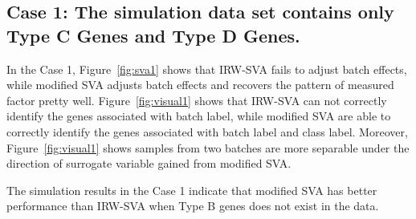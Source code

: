 \documentclass[11pt]{article}
\begin{document}
\subsection{Case 1: The simulation data set contains only Type C Genes and Type D Genes.}

In the Case 1, Figure~\ref{fig:sva1} shows that IRW-SVA fails to adjust batch effects, while modified SVA adjusts batch effects and recovers the pattern of measured factor pretty well. Figure~\ref{fig:visual1} shows that IRW-SVA can not correctly identify the genes associated with batch label, while modified SVA are able to correctly identify the genes associated with batch label and class label. Moreover, Figure~\ref{fig:visual1} shows samples from two batches are more separable under the direction of surrogate variable gained from modified SVA. 

The simulation results in the Case 1 indicate that modified SVA has better performance than IRW-SVA when Type B genes does not exist in the data.
\end{document}
